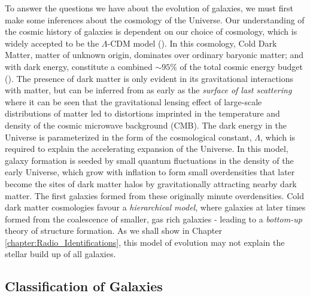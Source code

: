 To answer the questions we have about the evolution of galaxies, we must first make some inferences about the cosmology of the Universe. Our understanding of the cosmic history of galaxies is dependent on our choice of cosmology, which is widely accepted to be the $\Lambda$-CDM model (\citealt{Peebles_1980}). In this cosmology, Cold Dark Matter, matter of unknown origin, dominates over ordinary baryonic matter; and with dark energy, constitute a combined $\sim 95\%$ of the total cosmic energy budget (\citealt{Fukugita_2004}). The presence of dark matter is only evident in its gravitational interactions with matter, but can be inferred from as early as the \textit{surface of last scattering} where it can be seen that the gravitational lensing effect of large-scale distributions of matter led to distortions imprinted in the temperature and density of the cosmic microwave background (CMB). The dark energy in the Universe is parameterized in the form of the cosmological constant, $\Lambda$, which is required to explain the accelerating expansion of the Universe. In this model, galaxy formation is seeded by small quantum fluctuations in the density of the early Universe, which grow with inflation to form small overdensities that later become the sites of dark matter halos by gravitationally attracting nearby dark matter. The first galaxies formed from these originally minute overdensities. Cold dark matter cosmologies favour a \textit{hierarchical model}, where galaxies at later times formed from the coalescence of smaller, gas rich galaxies - leading to a \textit{bottom-up} theory of structure formation. As we shall show in Chapter \ref{chapter:Radio_Identifications}, this model of evolution may not explain the stellar build up of all galaxies.

\subsection{Classification of Galaxies}

